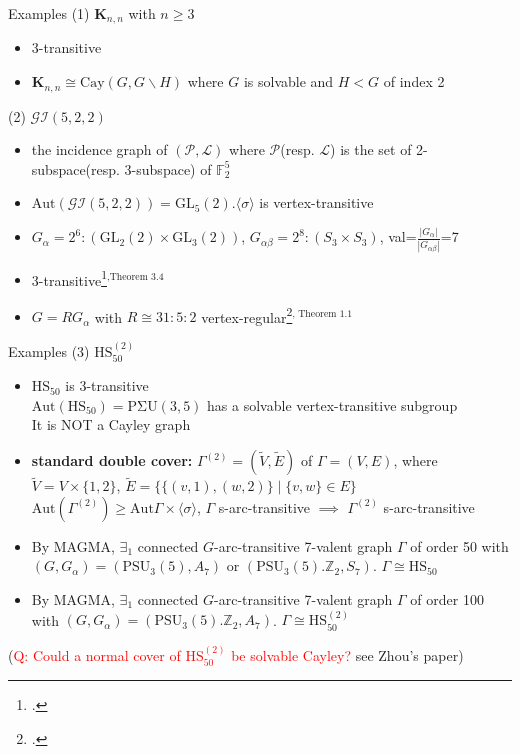 \documentclass{beamer}
\def\GL{\mathrm{GL}}
\def\PSU{\mathrm{PSU}}
\def\PSigU{\mathrm{P\Sigma U}}
\def\Aut{\mathrm{Aut}}
\def\Cay{\mathrm{Cay}}
\def\HS{\mathrm{HS}}
\def\GI{\mathcal{GI}}
\begin{document}
\begin{frame}{Examples}
(1) $\mathbf{K}_{n,n}$ with $n\geq 3$
\begin{itemize}
	\item 3-transitive
	\item $\mathbf{K}_{n,n}\cong \Cay(G,G\backslash H)$ where $G$ is solvable and $H<G$ of index 2
\end{itemize}

(2) $\mathcal{GI}(5,2,2)$
\begin{itemize}
	\item the incidence graph of $(\mathcal{P,L})$ where $\mathcal{P}$(resp. $\mathcal{L}$) is the set of 2-subspace(resp. 3-subspace) of $\mathbb{F}_2^5$
	\item $\Aut(\GI(5,2,2))=\GL_5(2).\langle \sigma\rangle$ is vertex-transitive
	\item $G_\alpha=2^6:(\GL_2(2)\times\GL_3(2))$, $G_{\alpha\beta}=2^8:(S_3\times S_3)$, val=$\frac{|G_\alpha|}{|G_{\alpha\beta}|}$=7
	\item 3-transitive\footcite{LI20162907}$^\text{,Theorem 3.4}$
	\item $G=RG_\alpha$ with $R\cong 31:5:2$ vertex-regular\footcite{LI2022factorizations}$^\text{, Theorem 1.1}$
\end{itemize}

\end{frame}

\begin{frame}{Examples}
(3) $\HS_{50}^{(2)}$
\begin{itemize}
	\item $\HS_{50}$ is 3-transitive \\$\Aut(\HS_{50})=\PSigU(3,5)$ has a solvable vertex-transitive subgroup\\ It is NOT a Cayley graph
	\item \textbf{standard double cover:} $\Gamma^{(2)}=(\tilde{V},\tilde{E})$ of $\Gamma=(V,E)$, where\\ $\tilde{V}=V\times\{1,2\}$, $\tilde{E}=\{\{(v,1),(w,2)\}\mid\{v,w\}\in E\}$\\ $\Aut(\Gamma^{(2)})\geq \Aut\Gamma\times\langle\sigma\rangle$, $\Gamma$ s-arc-transitive $\implies$ $\Gamma^{(2)}$ s-arc-transitive
	\item By MAGMA, $\exists_1$ connected $G$-arc-transitive 7-valent graph $\Gamma$ of order 50 with $(G,G_\alpha)=(\PSU_3(5),A_7)$ or $(\PSU_3(5).\mathbb{Z}_2,S_7)$. $\Gamma\cong \HS_{50}$
	\item By MAGMA, $\exists_1$ connected $G$-arc-transitive 7-valent graph $\Gamma$ of order 100 with $(G,G_\alpha)=(\PSU_3(5).\mathbb{Z}_2,A_7)$. $\Gamma\cong \HS_{50}^{(2)}$
\end{itemize}
(\textcolor{red}{Q: Could a normal cover of $\HS_{50}^{(2)}$ be solvable Cayley?} see Zhou's paper)
\end{frame}
\end{document}
